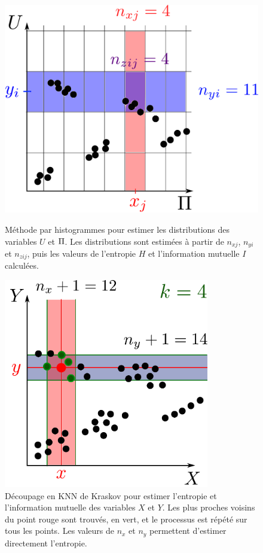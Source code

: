 \documentclass[../main]{subfiles}
\begin{document}
\begin{figure}
    \begin{minipage}{0.4\textwidth}
    \centering
    \includegraphics[width=\textwidth]{boxes}
    \caption{Méthode par histogrammes pour estimer les distributions des variables $U$ et $\Pi$. Les distributions sont estimées à partir de $n_{xj}$, $n_{yi}$ et $n_{zij}$, puis les valeurs de l'entropie $H$ et l'information mutuelle $I$ calculées.}
    \label{fig:binning}  
    \end{minipage}
    \hfill
    \begin{minipage}{0.4\textwidth}    
            \centering
            \includegraphics[width=0.8\textwidth]{kraskov.pdf}
            \caption{Découpage en KNN de Kraskov pour estimer l'entropie et l'information mutuelle des variables $X$ et $Y$. Les plus proches voisins du point rouge sont trouvés, en vert, et le processus est répété sur tous les points. Les valeurs de $n_x$ et $n_y$ permettent d'estimer directement l'entropie.}
            \label{fig:kraskov}
    \end{minipage}
    \end{figure}
\end{document}
